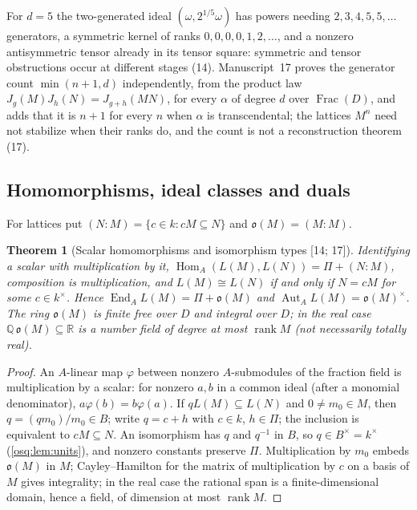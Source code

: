 \documentclass[11pt,letterpaper]{article}
\numberwithin{equation}{section}
\newtheorem{theorem}{Theorem}[section]
\theoremstyle{definition}
\theoremstyle{remark}
\theoremstyle{plain}
\newcommand{\Q}{\mathbb Q}
\newcommand{\R}{\mathbb R}
\newcommand{\Hom}{\operatorname{Hom}}
\newcommand{\End}{\operatorname{End}}
\newcommand{\Frac}{\operatorname{Frac}}
\newcommand{\rk}{\operatorname{rank}}
\newcommand{\src}[1]{\textup{\textsf{[#1]}}}
\begin{document}
For $d=5$ the two-generated ideal $(\omega,2^{1/5}\omega)$ has powers needing $2,3,4,5,5,\dots$ generators, a symmetric kernel of ranks
$0,0,0,0,1,2,\dots$, and a nonzero antisymmetric tensor already in its tensor square: symmetric and tensor obstructions occur at different
stages (14). Manuscript~17 proves the generator count $\min(n+1,d)$ independently, from the product law
$J_g(M)J_h(N)=J_{g+h}(MN)$, for every $\alpha$ of degree $d$ over $\Frac(D)$, and adds that it is $n+1$ for every $n$ when $\alpha$ is
transcendental; the lattices $M^n$ need not stabilize when their ranks do, and the count is not a reconstruction theorem (17).

\subsection{Homomorphisms, ideal classes and duals}\label{osq:tn:sub:hom}

For lattices put $(N:M)=\{c\in k:cM\subseteq N\}$ and $\mathfrak o(M)=(M:M)$.

\begin{theorem}[Scalar homomorphisms and isomorphism types \src{14; 17}]\label{osq:tn:thm:hom}
Identifying a scalar with multiplication by it, $\Hom_A(L(M),L(N))=\Pi+(N:M)$, composition is multiplication, and
$L(M)\cong L(N)$ if and only if $N=cM$ for some $c\in k^\times$. Hence $\End_AL(M)=\Pi+\mathfrak o(M)$ and
$\operatorname{Aut}_AL(M)=\mathfrak o(M)^\times$. The ring $\mathfrak o(M)$ is finite free over $D$ and integral over $D$; in the real case
$\Q\,\mathfrak o(M)\subseteq\R$ is a number field of degree at most $\rk M$ (not necessarily totally real).
\end{theorem}
\begin{proof}
An $A$-linear map $\varphi$ between nonzero $A$-submodules of the fraction field is multiplication by a scalar: for nonzero $a,b$ in a
common ideal (after a monomial denominator), $a\varphi(b)=b\varphi(a)$. If $qL(M)\subseteq L(N)$ and $0\ne m_0\in M$, then
$q=(qm_0)/m_0\in B$; write $q=c+h$ with $c\in k$, $h\in\Pi$; the inclusion is equivalent to $cM\subseteq N$. An isomorphism has $q$ and
$q^{-1}$ in $B$, so $q\in B^\times=k^\times$ (\cref{osq:lem:units}), and nonzero constants preserve $\Pi$. Multiplication by $m_0$ embeds
$\mathfrak o(M)$ in $M$; Cayley--Hamilton for the matrix of multiplication by $c$ on a basis of $M$ gives integrality; in the real case the
rational span is a finite-dimensional domain, hence a field, of dimension at most $\rk M$.
\end{proof}
\end{document}
